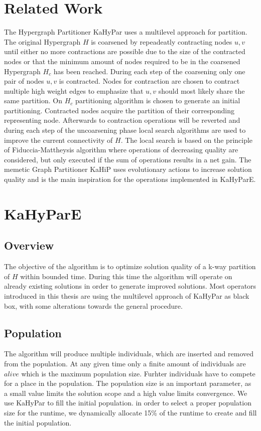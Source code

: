 \documentclass[a4paper,12pt,bibtotoc,titlepage, liststotoc,BCOR7mm,headsepline,pointlessnumbers]{scrbook}
\numberwithin{equation}{section}
\begin{document}
\chapter{Related Work}
The Hypergraph Partitioner KaHyPar uses a multilevel approach for partition. The original Hypergraph $H$ is coarsened by repeadeatly contracting nodes $u,v$ until either no more contractions are possible due to the size of the contracted nodes or that the minimum amount of nodes required to be in the coarsened Hypergraph $H_c$ has been reached. During each step of the coarsening only one pair of nodes $u, v$ is contracted. Nodes for contraction are chosen to contract multiple high weight edges to emphasize that $u,v$ should most likely share the same partition. 
On $H_c$ partitioning algorithm is chosen to generate an initial partitioning. Contracted nodes acquire the partition of their corresponding representing node.  Afterwards to contraction operations will be reverted and 
during each step of the uncoarsening phase local search algorithms are used to improve the current connectivity of $H$. The local search is based on the principle of
Fiduccia-Mattheysis algorithm where operations of decreasing quality are considered, but only executed if the sum of operations results in a net gain.
\newline
The memetic Graph Partitioner KaHiP uses evolutionary actions to increase solution quality and is the main inspiration for the operations implemented in KaHyParE.
\chapter{KaHyParE}
\section{Overview}
The objective of the algorithm is to optimize solution quality of a k-way partition of $H$ within bounded time. During this time
the algorithm will operate on already existing solutions in order to generate improved solutions. Most operators introduced in this 
thesis are using the multilevel approach of KaHyPar as black box, with some alterations towards the general procedure.  
\section{Population}
The algorithm will produce multiple individuals, which are inserted and removed from the population. At any given time only a finite amount of
individuals are $alive$ which is the maximum population size. Furhter individuals have to compete for a place in the population. 
The population size is an important parameter, as a small value limits the solution scope and a high value limits convergence.
We use KaHyPar to fill the initial population.
in order to select a proper population size for the runtime, we dynamically allocate 15\% of the runtime to create and fill the initial population.
\end{document}
